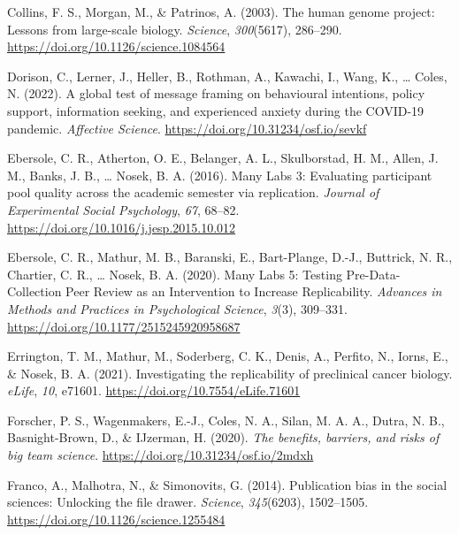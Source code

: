 \documentclass[
  man,floatsintext]{apa6}
\newlength{\cslhangindent}
\newlength{\cslentryspacingunit} %
\newenvironment{CSLReferences}[2] %
 {%
  \setlength{\parindent}{0pt}
  \ifodd #1
  \let\oldpar\par
  \def\par{\hangindent=\cslhangindent\oldpar}
  \fi
  \setlength{\parskip}{#2\cslentryspacingunit}
 }%
 {}
\begin{document}
\begin{CSLReferences}{1}{0}
\leavevmode{}%
Collins, F. S., Morgan, M., \& Patrinos, A. (2003). The human genome project: Lessons from large-scale biology. \emph{Science}, \emph{300}(5617), 286--290. \url{https://doi.org/10.1126/science.1084564}

\leavevmode{}%
Dorison, C., Lerner, J., Heller, B., Rothman, A., Kawachi, I., Wang, K., \ldots{} Coles, N. (2022). A global test of message framing on behavioural intentions, policy support, information seeking, and experienced anxiety during the COVID-19 pandemic. \emph{Affective Science}. \url{https://doi.org/10.31234/osf.io/sevkf}

\leavevmode{}%
Ebersole, C. R., Atherton, O. E., Belanger, A. L., Skulborstad, H. M., Allen, J. M., Banks, J. B., \ldots{} Nosek, B. A. (2016). Many Labs 3: Evaluating participant pool quality across the academic semester via replication. \emph{Journal of Experimental Social Psychology}, \emph{67}, 68--82. \url{https://doi.org/10.1016/j.jesp.2015.10.012}

\leavevmode{}%
Ebersole, C. R., Mathur, M. B., Baranski, E., Bart-Plange, D.-J., Buttrick, N. R., Chartier, C. R., \ldots{} Nosek, B. A. (2020). Many Labs 5: Testing Pre-Data-Collection Peer Review as an Intervention to Increase Replicability. \emph{Advances in Methods and Practices in Psychological Science}, \emph{3}(3), 309--331. \url{https://doi.org/10.1177/2515245920958687}

\leavevmode{}%
Errington, T. M., Mathur, M., Soderberg, C. K., Denis, A., Perfito, N., Iorns, E., \& Nosek, B. A. (2021). Investigating the replicability of preclinical cancer biology. \emph{eLife}, \emph{10}, e71601. \url{https://doi.org/10.7554/eLife.71601}

\leavevmode{}%
Forscher, P. S., Wagenmakers, E.-J., Coles, N. A., Silan, M. A. A., Dutra, N. B., Basnight-Brown, D., \& IJzerman, H. (2020). \emph{The benefits, barriers, and risks of big team science}. \url{https://doi.org/10.31234/osf.io/2mdxh}

\leavevmode{}%
Franco, A., Malhotra, N., \& Simonovits, G. (2014). Publication bias in the social sciences: Unlocking the file drawer. \emph{Science}, \emph{345}(6203), 1502--1505. \url{https://doi.org/10.1126/science.1255484}


\end{CSLReferences}
\end{document}
